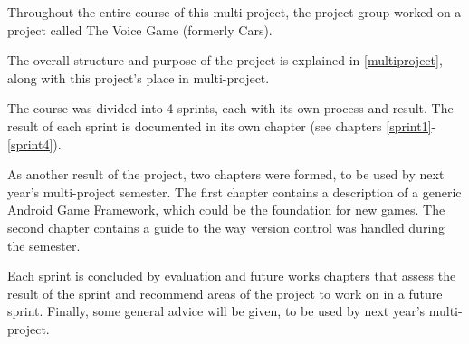 Throughout the entire course of this multi-project, the project-group worked on a project called The Voice Game (formerly Cars).

The overall structure and purpose of the project is explained in \cref{multiproject}, along with this project's place in multi-project.

The course was divided into 4 sprints, each with its own process and result.
The result of each sprint is documented in its own chapter (see chapters \ref{sprint1}-\ref{sprint4}).

As another result of the project, two chapters were formed, to be used by next year's multi-project semester.
The first chapter contains a description of a generic Android Game Framework, which could be the foundation for new games.
The second chapter contains a guide to the way version control was handled during the semester.

Each sprint is concluded by evaluation and future works chapters that assess the result of the sprint and recommend areas of the project to work on in a future sprint.
Finally, some general advice will be given, to be used by next year's multi-project.